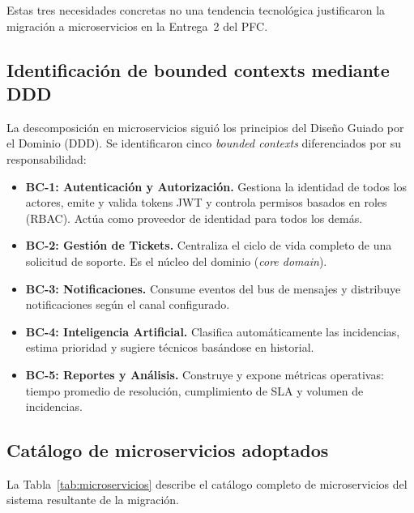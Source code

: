 \documentclass[12pt, a4paper]{article}
\begin{document}
Estas tres necesidades concretas no una tendencia tecnológica justificaron
la migración a microservicios en la Entrega~2 del PFC.

\subsection{Identificación de bounded contexts mediante DDD}

La descomposición en microservicios siguió los principios del Diseño Guiado por
el Dominio (DDD). Se identificaron cinco \textit{bounded contexts} diferenciados
por su responsabilidad:

\begin{itemize}
  \item \textbf{BC-1: Autenticación y Autorización.} Gestiona la identidad de
        todos los actores, emite y valida tokens JWT y controla permisos basados
        en roles (RBAC). Actúa como proveedor de identidad para todos los demás.
  \item \textbf{BC-2: Gestión de Tickets.} Centraliza el ciclo de vida completo
        de una solicitud de soporte. Es el núcleo del dominio (\textit{core domain}).
  \item \textbf{BC-3: Notificaciones.} Consume eventos del bus de mensajes y
        distribuye notificaciones según el canal configurado.
  \item \textbf{BC-4: Inteligencia Artificial.} Clasifica automáticamente las
        incidencias, estima prioridad y sugiere técnicos basándose en historial.
  \item \textbf{BC-5: Reportes y Análisis.} Construye y expone métricas operativas:
        tiempo promedio de resolución, cumplimiento de SLA y volumen de incidencias.
\end{itemize}

\subsection{Catálogo de microservicios adoptados}

La Tabla~\ref{tab:microservicios} describe el catálogo completo de microservicios
del sistema resultante de la migración.
\end{document}
